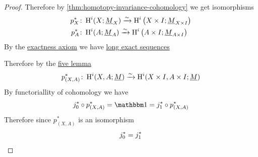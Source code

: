 \documentclass[../../main]{subfiles}
\begin{document}
\begin{proof}
  Therefore by \autoref{thm:homotopy-invariance-cohomology} we get isomorphisms
  \begin{align*}
    p_{X}^{\ast}\colon& \operatorname{H}^{i}(X; \underline{M}_{X}) \xrightarrow{\sim} \operatorname{H}^{i} \left( X \times I; \underline{M}_{X \times I} \right) \\
    p_{A}^{\ast}\colon& \operatorname{H}^{i}(A; \underline{M}_{A}) \xrightarrow{\sim} \operatorname{H}^{i} \left( A \times I; \underline{M}_{A \times I} \right)
  \end{align*}
  By the \hyperref[thm:exactness-axiom]{exactness axiom} we have \hyperref[def:exact-sequence]{long exact sequences}
  \begin{center}
  \end{center}
  Therefore by the \hyperref[lemma:five-lemma]{five lemma}
  \begin{equation*}
    p_{(X, A)}^{\ast}\colon \operatorname{H}^{i}(X, A; \underline{M}) \xrightarrow{\sim} \operatorname{H}^{i}(X \times I, A \times I; \underline{M})
  \end{equation*}
  By functoriallity of cohomology we have
  \begin{equation*}
    j_{0}^{\ast} \circ p_{(X, A)}^{\ast} = \id = j_{1}^{\ast} \circ p_{(X, A)}^{\ast}
  \end{equation*}
  Therefore since \(p_{(X, A)}^{\ast}\) is an isomorphism
  \begin{equation*}
    j_{0}^{\ast} = j_{1}^{\ast} \qedhere
  \end{equation*}
\end{proof}
\end{document}
